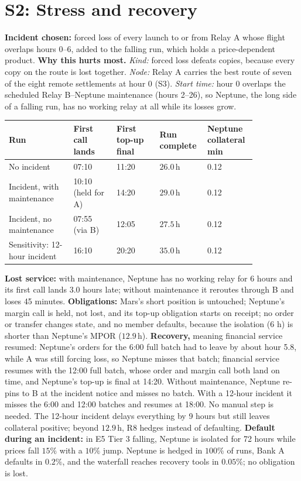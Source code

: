 \documentclass[11pt]{article}
\theoremstyle{definition}
\theoremstyle{remark}
\newcommand{\h}{\,\mathrm{h}}
\begin{document}
\section{S2: Stress and recovery}\label{app:s2}
\textbf{Incident chosen:} forced loss of every launch to or from Relay A whose flight overlaps hours 0--6, added to the falling run, which holds a price-dependent product. \textbf{Why this hurts most.} \emph{Kind:} forced loss defeats copies, because every copy on the route is lost together. \emph{Node:} Relay A carries the best route of seven of the eight remote settlements at hour 0 (S3). \emph{Start time:} hour 0 overlaps the scheduled Relay B--Neptune maintenance (hours 2--26), so Neptune, the long side of a falling run, has no working relay at all while its losses grow.
\begin{table}[H]
\centering
\small
\begin{tabular}{@{}p{0.24\linewidth}p{0.16\linewidth}p{0.16\linewidth}p{0.12\linewidth}p{0.16\linewidth}@{}}
\toprule
Run & First call lands & First top-up final & Run complete & Neptune collateral min \\
\midrule
No incident & 07:10 & 11:20 & $26.0\h$ & 0.12 \\
Incident, with maintenance & 10:10 (held for A) & 14:20 & $29.0\h$ & 0.12 \\
Incident, no maintenance & 07:55 (via B) & 12:05 & $27.5\h$ & 0.12 \\
Sensitivity: 12-hour incident & 16:10 & 20:20 & $35.0\h$ & 0.12 \\
\bottomrule
\end{tabular}
\end{table}
\textbf{Lost service:} with maintenance, Neptune has no working relay for 6 hours and its first call lands 3.0 hours late; without maintenance it reroutes through B and loses 45 minutes. \textbf{Obligations:} Mars's short position is untouched; Neptune's margin call is held, not lost, and its top-up obligation starts on receipt; no order or transfer changes state, and no member defaults, because the isolation (6 h) is shorter than Neptune's MPOR ($12.9\h$). \textbf{Recovery,} meaning financial service resumed: Neptune's orders for the 6:00 full batch had to leave by about hour 5.8, while A was still forcing loss, so Neptune misses that batch; financial service resumes with the 12:00 full batch, whose order and margin call both land on time, and Neptune's top-up is final at 14:20. Without maintenance, Neptune re-pins to B at the incident notice and misses no batch. With a 12-hour incident it misses the 6:00 and 12:00 batches and resumes at 18:00. No manual step is needed. The 12-hour incident delays everything by 9 hours but still leaves collateral positive; beyond $12.9\h$, R8 hedges instead of defaulting. \textbf{Default during an incident:} in E5 Tier 3 falling, Neptune is isolated for 72 hours while prices fall $15\%$ with a $10\%$ jump. Neptune is hedged in $100\%$ of runs, Bank A defaults in $0.2\%$, and the waterfall reaches recovery tools in $0.05\%$; no obligation is lost.
\end{document}
